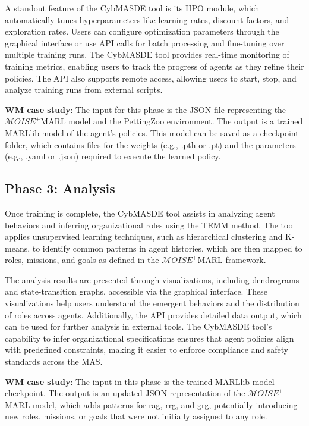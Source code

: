 \documentclass[pdflatex,sn-mathphys-num]{sn-jnl}%
\theoremstyle{thmstyleone}%
\theoremstyle{thmstyletwo}%
\theoremstyle{thmstylethree}%
\begin{document}
A standout feature of the CybMASDE tool is its HPO module, which automatically tunes hyperparameters like learning rates, discount factors, and exploration rates. Users can configure optimization parameters through the graphical interface or use API calls for batch processing and fine-tuning over multiple training runs. The CybMASDE tool provides real-time monitoring of training metrics, enabling users to track the progress of agents as they refine their policies. The API also supports remote access, allowing users to start, stop, and analyze training runs from external scripts.

\textbf{WM case study}: The input for this phase is the JSON file representing the $\mathcal{M}OISE^+$MARL model and the PettingZoo environment. The output is a trained MARLlib model of the agent's policies. This model can be saved as a checkpoint folder, which contains files for the weights (e.g., .pth or .pt) and the parameters (e.g., .yaml or .json) required to execute the learned policy.

\subsection{Phase 3: Analysis}

Once training is complete, the CybMASDE tool assists in analyzing agent behaviors and inferring organizational roles using the TEMM method. The tool applies unsupervised learning techniques, such as hierarchical clustering and K-means, to identify common patterns in agent histories, which are then mapped to roles, missions, and goals as defined in the $\mathcal{M}OISE^+$MARL framework.

The analysis results are presented through visualizations, including dendrograms and state-transition graphs, accessible via the graphical interface. These visualizations help users understand the emergent behaviors and the distribution of roles across agents. Additionally, the API provides detailed data output, which can be used for further analysis in external tools. The CybMASDE tool's capability to infer organizational specifications ensures that agent policies align with predefined constraints, making it easier to enforce compliance and safety standards across the MAS.

\textbf{WM case study}: The input in this phase is the trained MARLlib model checkpoint. The output is an updated JSON representation of the $\mathcal{M}OISE^+$MARL model, which adds patterns for rag, rrg, and grg, potentially introducing new roles, missions, or goals that were not initially assigned to any role.
\end{document}
